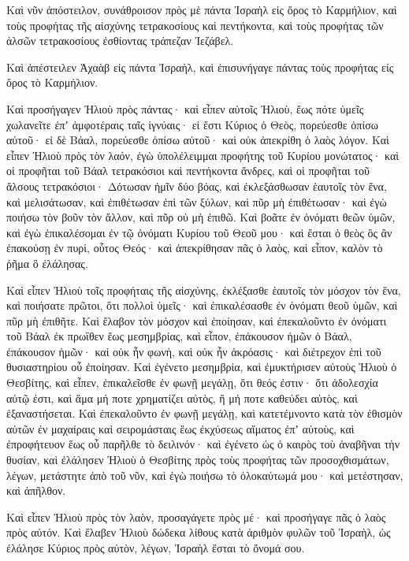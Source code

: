{Καὶ νῦν ἀπόστειλον, συνάθροισον πρὸς μὲ πάντα Ἰσραὴλ εἰς ὄρος τὸ Καρμήλιον, καὶ τοὺς προφήτας τῆς αἰσχύνης τετρακοσίους καὶ πεντήκοντα, καὶ τοὺς προφήτας τῶν ἀλσῶν τετρακοσίους ἐσθίοντας τράπεζαν Ἰεζάβελ.
\par }{\PP {}Καὶ ἀπέστειλεν Ἀχαὰβ εἰς πάντα Ἰσραὴλ, καὶ ἐπισυνήγαγε πάντας τοὺς προφήτας εἰς ὄρος τὸ Καρμήλιον.
\par }{\PP {}Καὶ προσήγαγεν Ἠλιοὺ πρὸς πάντας· καὶ εἶπεν αὐτοῖς Ἠλιοὺ, ἕως πότε ὑμεῖς χωλανεῖτε ἐπʼ ἀμφοτέραις ταῖς ἰγνύαις· εἰ ἔστι Κύριος ὁ Θεὸς, πορεύεσθε ὀπίσω αὐτοῦ· εἰ δὲ Βάαλ, πορεύεσθε ὀπίσω αὐτοῦ· καὶ οὐκ ἀπεκρίθη ὁ λαὸς λόγον.
Καὶ εἶπεν Ἠλιοὺ πρὸς τὸν λαόν, ἐγὼ ὑπολέλειμμαι προφήτης τοῦ Κυρίου μονώτατος· καὶ οἱ προφῆται τοῦ Βάαλ τετρακόσιοι καὶ πεντήκοντα ἄνδρες, καὶ οἱ προφῆται τοῦ ἄλσους τετρακόσιοι·
Δότωσαν ἡμῖν δύο βόας, καὶ ἐκλεξάσθωσαν ἑαυτοῖς τὸν ἕνα, καὶ μελισάτωσαν, καὶ ἐπιθέτωσαν ἐπὶ τῶν ξύλων, καὶ πῦρ μὴ ἐπιθέτωσαν· καὶ ἐγὼ ποιήσω τὸν βοῦν τὸν ἄλλον, καὶ πῦρ οὐ μὴ ἐπιθῶ.
Καὶ βοᾶτε ἐν ὀνόματι θεῶν ὑμῶν, καὶ ἐγὼ ἐπικαλέσομαι ἐν τῷ ὀνόματι Κυρίου τοῦ Θεοῦ μου· καὶ ἔσται ὁ θεὸς ὃς ἂν ἐπακούσῃ ἐν πυρὶ, οὗτος Θεός· καὶ ἀπεκρίθησαν πᾶς ὁ λαὸς, καὶ εἶπον, καλὸν τὸ ῥῆμα ὃ ἐλάλησας.
\par }{\PP {}Καὶ εἶπεν Ἠλιοὺ τοῖς προφήταις τῆς αἰσχύνης, ἐκλέξασθε ἑαυτοῖς τὸν μόσχον τὸν ἕνα, καὶ ποιήσατε πρῶτοι, ὅτι πολλοὶ ὑμεῖς· καὶ ἐπικαλέσασθε ἐν ὀνόματι θεοῦ ὑμῶν, καὶ πῦρ μὴ ἐπιθῆτε.
Καὶ ἔλαβον τὸν μόσχον καὶ ἐποίησαν, καὶ ἐπεκαλοῦντο ἐν ὀνόματι τοῦ Βάαλ ἐκ πρωΐθεν ἕως μεσημβρίας, καὶ εἶπον, ἐπάκουσον ἡμῶν ὁ Βάαλ, ἐπάκουσον ἡμῶν· καὶ οὐκ ἦν φωνὴ, καὶ οὐκ ἦν ἀκρόασις· καὶ διέτρεχον ἐπὶ τοῦ θυσιαστηρίου οὗ ἐποίησαν.
Καὶ ἐγένετο μεσημβρία, καὶ ἐμυκτήρισεν αὐτοὺς Ἠλιοὺ ὁ Θεσβίτης, καὶ εἶπεν, ἐπικαλεῖσθε ἐν φωνῇ μεγάλῃ, ὅτι θεός ἐστιν· ὅτι ἀδολεσχία αὐτῷ ἐστι, καὶ ἅμα μή ποτε χρηματίζει αὐτὸς, ἢ μή ποτε καθεύδει αὐτὸς, καὶ ἐξαναστήσεται.
Καὶ ἐπεκαλοῦντο ἐν φωνῇ μεγάλῃ, καὶ κατετέμνοντο κατὰ τὸν ἐθισμὸν αὐτῶν ἐν μαχαίραις καὶ σειρομάσταις ἕως ἐκχύσεως αἵματος ἐπʼ αὐτοὺς,
καὶ ἐπροφήτευον ἕως οὗ παρῆλθε τὸ δειλινόν· καὶ ἐγένετο ὡς ὁ καιρὸς τοὺ ἀναβῆναι τὴν θυσίαν, καὶ ἐλάλησεν Ἠλιοὺ ὁ Θεσβίτης πρὸς τοὺς προφήτας τῶν προσοχθισμάτων, λέγων, μετάστητε ἀπὸ τοῦ νῦν, καὶ ἐγὼ ποιήσω τὸ ὁλοκαύτωμά μου· καὶ μετέστησαν, καὶ ἀπῆλθον.
\par }{\PP {}Καὶ εἶπεν Ἠλιοὺ πρὸς τὸν λαὸν, προσαγάγετε πρὸς μέ· καὶ προσήγαγε πᾶς ὁ λαὸς πρὸς αὐτόν.
Καὶ ἔλαβεν Ἡλιοὺ δώδεκα λίθους κατὰ ἀριθμὸν φυλῶν τοῦ Ἰσραὴλ, ὡς ἐλάλησε Κύριος πρὸς αὐτὸν, λέγων, Ἰσραὴλ ἔσται τὸ ὄνομά σου.
}
